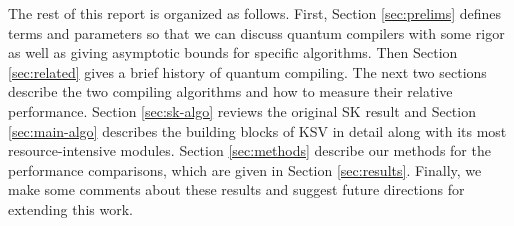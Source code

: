 The rest of this report is organized as follows.
First, Section \ref{sec:prelims} defines terms and parameters
so that we can discuss quantum compilers with some rigor as well as
giving asymptotic bounds for specific algorithms.
Then Section
\ref{sec:related} gives a brief history of quantum compiling.
The next two sections describe the two compiling algorithms and how
to measure their relative performance.
Section \ref{sec:sk-algo} reviews the original SK result and
Section \ref{sec:main-algo} describes the building blocks of KSV in detail
along with its
most resource-intensive modules. Section \ref{sec:methods} describe
our methods for the performance comparisons, which are given in Section
\ref{sec:results}. Finally, we make some comments about these results
and suggest future directions for extending this work.